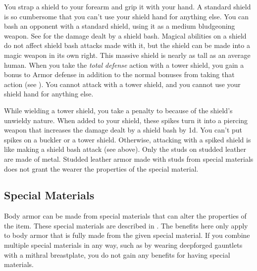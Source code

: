          You strap a shield to your forearm and grip it with your hand. A standard shield is so cumbersome that you can't use your shield hand for anything else.
         You can bash an opponent with a standard shield, using it as a medium bludgeoning weapon. See  for the damage dealt by a shield bash.
        Magical abilities on a shield do not affect shield bash attacks made with it, but the shield can be made into a magic weapon in its own right.
         This massive shield is nearly as tall as an average human.
        When you take the \textit{total defense} action with a tower shield, you gain a  bonus to Armor defense in addition to the normal bonuses from taking that action (see ).
        You cannot attack with a tower shield, and you cannot use your shield hand for anything else.

        While wielding a tower shield, you take a  penalty to  because of the shield's unwieldy nature.
         When added to your shield, these spikes turn it into a piercing weapon that increases the damage dealt by a shield bash by \plus1d. You can't put spikes on a buckler or a tower shield. Otherwise, attacking with a spiked shield is like making a shield bash attack (see above).
         Only the studs on studded leather are made of metal.
        Studded leather armor made with studs from special materials does not grant the wearer the properties of the special material.

    \subsection{Special Materials}\label{Special Materials}
        Body armor can be made from special materials that can alter the properties of the item.
        These special materials are described in .
        The benefits here only apply to body armor that is fully made from the given special material.
        If you combine multiple special materials in any way, such as by wearing deepforged gauntlets with a mithral breastplate, you do not gain any benefits for having special materials.

